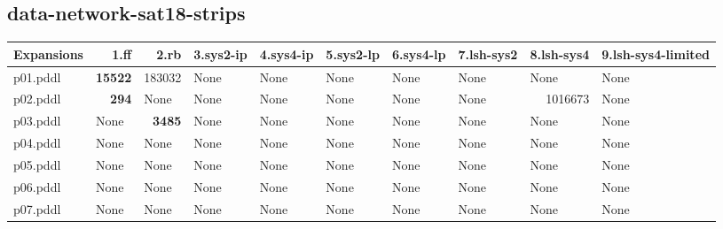 \documentclass{article}
\begin{document}
\hypertarget{expansions-data-network-sat18-strips}{}
\subsection*{data-network-sat18-strips}

\begin{tabular}{@{}lrrrrrrrrr@{}}
Expansions & 1.ff & 2.rb & 3.sys2-ip & 4.sys4-ip & 5.sys2-lp & 6.sys4-lp & 7.lsh-sys2 & 8.lsh-sys4 & 9.lsh-sys4-limited \\
\midrule
p01.pddl & \textbf{15522} & 183032 & \multicolumn{1}{|l|}{None} & \multicolumn{1}{|l|}{None} & \multicolumn{1}{|l|}{None} & \multicolumn{1}{|l|}{None} & \multicolumn{1}{|l|}{None} & \multicolumn{1}{|l|}{None} & \multicolumn{1}{|l|}{None} \\
p02.pddl & \textbf{294} & \multicolumn{1}{|l|}{None} & \multicolumn{1}{|l|}{None} & \multicolumn{1}{|l|}{None} & \multicolumn{1}{|l|}{None} & \multicolumn{1}{|l|}{None} & \multicolumn{1}{|l|}{None} & 1016673 & \multicolumn{1}{|l|}{None} \\
p03.pddl & \multicolumn{1}{|l|}{None} & \textbf{3485} & \multicolumn{1}{|l|}{None} & \multicolumn{1}{|l|}{None} & \multicolumn{1}{|l|}{None} & \multicolumn{1}{|l|}{None} & \multicolumn{1}{|l|}{None} & \multicolumn{1}{|l|}{None} & \multicolumn{1}{|l|}{None} \\
p04.pddl & \multicolumn{1}{|l|}{None} & \multicolumn{1}{|l|}{None} & \multicolumn{1}{|l|}{None} & \multicolumn{1}{|l|}{None} & \multicolumn{1}{|l|}{None} & \multicolumn{1}{|l|}{None} & \multicolumn{1}{|l|}{None} & \multicolumn{1}{|l|}{None} & \multicolumn{1}{|l|}{None} \\
p05.pddl & \multicolumn{1}{|l|}{None} & \multicolumn{1}{|l|}{None} & \multicolumn{1}{|l|}{None} & \multicolumn{1}{|l|}{None} & \multicolumn{1}{|l|}{None} & \multicolumn{1}{|l|}{None} & \multicolumn{1}{|l|}{None} & \multicolumn{1}{|l|}{None} & \multicolumn{1}{|l|}{None} \\
p06.pddl & \multicolumn{1}{|l|}{None} & \multicolumn{1}{|l|}{None} & \multicolumn{1}{|l|}{None} & \multicolumn{1}{|l|}{None} & \multicolumn{1}{|l|}{None} & \multicolumn{1}{|l|}{None} & \multicolumn{1}{|l|}{None} & \multicolumn{1}{|l|}{None} & \multicolumn{1}{|l|}{None} \\
p07.pddl & \multicolumn{1}{|l|}{None} & \multicolumn{1}{|l|}{None} & \multicolumn{1}{|l|}{None} & \multicolumn{1}{|l|}{None} & \multicolumn{1}{|l|}{None} & \multicolumn{1}{|l|}{None} & \multicolumn{1}{|l|}{None} & \multicolumn{1}{|l|}{None} & \multicolumn{1}{|l|}{None} \\

\end{tabular}
\end{document}
